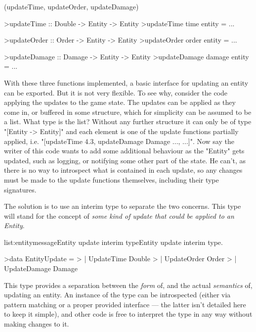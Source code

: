 \functions(updateTime, updateOrder, updateDamage)
\begin{haskell}

>updateTime :: Double -> Entity -> Entity
>updateTime time entity = ...

>updateOrder :: Order -> Entity -> Entity
>updateOrder order entity = ... 

>updateDamage :: Damage -> Entity -> Entity
>updateDamage damage entity = ...

\end{haskell}
\noindent With these three functions implemented, a basic interface for updating an entity can be exported. But it is not very flexible. To see why, consider the code applying the updates to the game state. The updates can be applied as they come in, or buffered in some structure, which for simplicity can be assumed to be a list. What type is the list? Without any further structure it can only be of type "[Entity -> Entity]" and each element is one of the update functions partially applied, i.e. "[updateTime 4.3, updateDamage Damage {...}, ...]". Now say the writer of this code wants to add some additional behaviour as the "Entity" gets updated, such as logging, or notifying some other part of the state. He can't, as there is no way to introspect what is contained in each update, so any changes must be made to the update functions themselves, including their type signatures.

The solution is to use an interim type to separate the two concerns. This type will stand for the concept of \emph{some kind of update that could be applied to an Entity}.

\vspace{-0.5em}
\begin{listing}{list:entitymessage}{Entity update interim type}{Entity update interim type.}{}
\end{listing}\vspace{-1.5em}

\begin{haskell}

>data EntityUpdate = 
>  | UpdateTime Double
>  | UpdateOrder Order
>  | UpdateDamage Damage

\end{haskell}
\noindent This type provides a separation between the \emph{form} of, and the actual \emph{semantics} of, updating an entity. An instance of the type can be introspected (either via pattern matching or a proper provided interface --- the latter isn't detailed here to keep it simple), and other code is free to interpret the type in any way without making changes to it.

